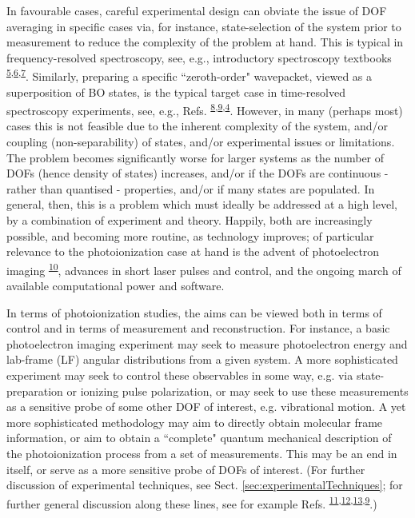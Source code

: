 \documentclass[10pt]{article}
\begin{document}
In favourable cases, careful experimental design can obviate the issue of DOF averaging in specific cases via, for instance, state-selection of the system prior to measurement to reduce the complexity of the problem at hand. This is typical in frequency-resolved spectroscopy, see, e.g., introductory spectroscopy textbooks \textsuperscript{\hyperref[csl:5]{5},\hyperref[csl:6]{6},\hyperref[csl:7]{7}}. Similarly, preparing a specific ``zeroth-order" wavepacket, viewed as a superposition of BO states, is the typical target case in time-resolved spectroscopy experiments, see, e.g., Refs. \textsuperscript{\hyperref[csl:8]{8},\hyperref[csl:9]{9},\hyperref[csl:4]{4}}. However, in many (perhaps most) cases this is not feasible due to the inherent complexity of the system, and/or coupling (non-separability) of states, and/or experimental issues or limitations. The problem becomes significantly worse for larger systems as the number of DOFs (hence density of states) increases, and/or if the DOFs are continuous - rather than quantised - properties, and/or if many states are populated. In general, then, this is a problem which must ideally be addressed at a high level, by a combination of experiment and theory. Happily, both are increasingly possible, and becoming more routine, as technology improves; of particular relevance to the photoionization case at hand is the advent of photoelectron imaging \textsuperscript{\hyperref[csl:10]{10}}, advances in short laser pulses and control, and the ongoing march of available computational power and software.

In terms of photoionization studies, the aims can be viewed both in terms of control and in terms of measurement and reconstruction. For instance, a basic photoelectron imaging experiment may seek to measure photoelectron energy and lab-frame (LF) angular distributions from a given system. A more sophisticated experiment may seek to control these observables in some way, e.g. via state-preparation or ionizing pulse polarization, or may seek to use these measurements as a sensitive probe of some other DOF of interest, e.g. vibrational motion. A yet more sophisticated methodology may aim to directly obtain molecular frame information, or aim to obtain a ``complete" quantum mechanical description of the photoionization process from a set of measurements. This may be an end in itself, or serve as a more sensitive probe of DOFs of interest. (For further discussion of experimental techniques, see Sect. \ref{sec:experimentalTechniques}; for further general discussion along these lines, see for example Refs. \textsuperscript{\hyperref[csl:11]{11},\hyperref[csl:12]{12},\hyperref[csl:13]{13},\hyperref[csl:9]{9}}.)
\end{document}
